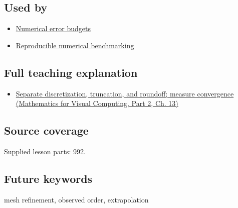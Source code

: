 \subsection{Used by}\label{appendix-aca80b6bf17a-used-by}

\hypertarget{appendix-aca80b6bf17a-used-by}{}

\begin{itemize}
\tightlist
\item
  \hyperref[appendix-31b8c295e05f]{Numerical error budgets}
\item
  \hyperref[appendix-b9db93e28371]{Reproducible numerical benchmarking}
\end{itemize}

\subsection{Full teaching explanation}\label{appendix-aca80b6bf17a-full-teaching-explanation}

\hypertarget{appendix-aca80b6bf17a-full-teaching-explanation}{}

\begin{itemize}
\tightlist
\item
  \href{../02-Mathematics-for-Visual-Computing-P02/main.pdf\#02-foundations-ii-ch029-separate-discretization-truncation-and-roundoff-measure-convergence}{Separate discretization, truncation, and roundoff; measure convergence (Mathematics for Visual Computing, Part 2, Ch. 13)}
\end{itemize}

\subsection{Source coverage}\label{appendix-aca80b6bf17a-source-coverage}

\hypertarget{appendix-aca80b6bf17a-source-coverage}{}

Supplied lesson parts: 992.

\subsection{Future keywords}\label{appendix-aca80b6bf17a-future-keywords}

\hypertarget{appendix-aca80b6bf17a-future-keywords}{}

mesh refinement, observed order, extrapolation
